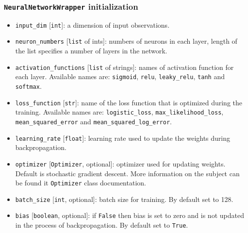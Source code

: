 \documentclass[a4]{article}
\begin{document}
\subsubsection{\texttt{NeuralNetworkWrapper} initialization}
\begin{itemize}
\itemsep0em 
	\item \texttt{input\_dim} [\texttt{int}]: a dimension of input observations. 
	\item \texttt{neuron\_numbers} [\texttt{list} of ints]: numbers of neurons in each layer, length of the list specifies a number of layers in the network.
	\item \texttt{activation\_functions} [\texttt{list} of strings]: names of activation function for each layer. Available names are: \texttt{sigmoid}, \texttt{relu}, \texttt{leaky\_relu}, \texttt{tanh} and \texttt{softmax}.
	\item \texttt{loss\_function} [\texttt{str}]: name of the loss function that is optimized during the training. Available names are: \texttt{logistic\_loss}, \texttt{max\_likelihood\_loss}, \texttt{mean\_squared\_error} and \texttt{mean\_squared\_log\_error}.
	\item \texttt{learning\_rate} [\texttt{float}]: learning rate used to update the weights during backpropagation. 
	\item \texttt{optimizer} [\texttt{Optimizer}, optional]: optimizer used for updating weights. Default is stochastic gradient descent. More information on the subject can be found it \texttt{Optimizer} class documentation. 
	\item \texttt{batch\_size} [\texttt{int}, optional]: batch size for training. By default set to 128.
	\item \texttt{bias} [\texttt{boolean}, optional]: if \texttt{False} then bias is set to zero and is not updated in the process of backpropagation. By default set to \texttt{True}.
\end{itemize}

\newpage 
\end{document}

